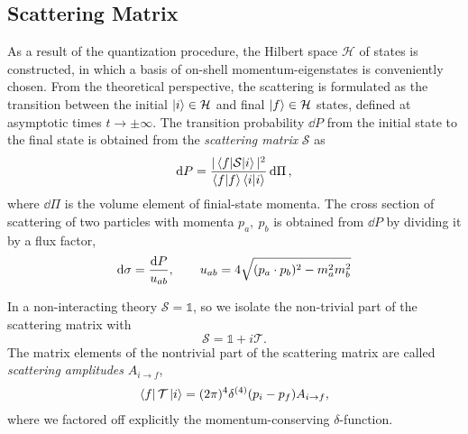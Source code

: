 \subsection{Scattering Matrix}
\label{sec:s-matr-pert}

As a result of the quantization procedure, the Hilbert space $\mathcal{H}$ of states is constructed,
in which a basis of on-shell momentum-eigenstates is conveniently chosen.
From the theoretical perspective, the scattering is formulated as the transition between
the initial $\ket{i}\in \mathcal{H}$ and final $\ket{f}\in \mathcal{H}$ states, defined
at asymptotic times $t\to \pm \infty$.
The transition probability $\dd{P}$ from the initial state to the final state is obtained from the \emph{scattering matrix} $\mathcal{S}$ as
\begin{equation}
  \dd{P} = \frac{\Abs{\mel{f}{\mathcal{S}}{i}}}{\ip{f}{f}\ip{i}{i}} \dd{\Pi},
\end{equation}
where $\dd{\Pi}$ is the volume element of finial-state momenta. 
The cross section of scattering of two particles with momenta $p_a,\ p_b$ is obtained from $\dd{P}$ by dividing it by a flux factor,
\begin{equation}
  \dd{\sigma} = \frac{\dd{P}}{u_{ab}}, \qquad u_{ab} = 4 \sqrt{(\sp(p_a,p_b))^2 - m_a^2 m_b^2} 
\end{equation}


In a non-interacting theory $\mathcal{S}=\mathbb{1}$, so we isolate
the non-trivial part of the scattering matrix with
\begin{equation} \label{eq:tmatrix}
  \mathcal{S} = \mathbb{1}+i \mathcal{T}.
\end{equation}
The matrix elements of the nontrivial part of the scattering matrix are called \emph{scattering amplitudes} $A_{i\to f}$,
\begin{align} \label{eq:matrix_element}
  \bra{f}{\mathcal{T}}\ket{i} =  (2\pi)^4 \delta^{(4)}(p_i- p_f) A_{i\to f},
\end{align}
where we factored off explicitly the momentum-conserving $\delta$-function.

